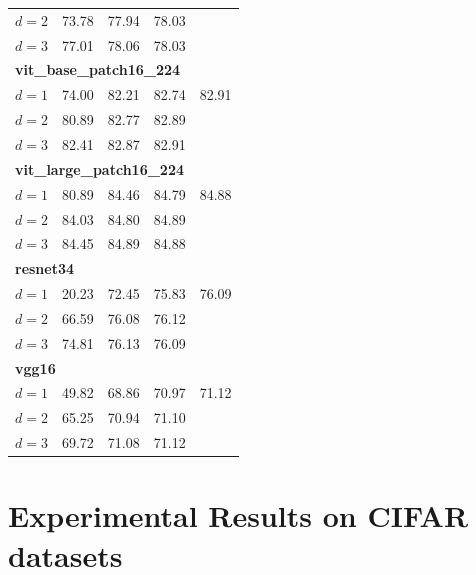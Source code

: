 \begin{table}[htbp]
\begin{minipage}{0.48\textwidth}
\begin{tabular}{lcccc}
$d=2$ & 73.78 & 77.94 & 78.03 \\
$d=3$ & 77.01 & 78.06 & 78.03 \\
\midrule
\multicolumn{5}{l}{\textbf{vit\_base\_patch16\_224}} \\
$d=1$ & 74.00 & 82.21 & 82.74 & 82.91 \\
$d=2$ & 80.89 & 82.77 & 82.89 \\
$d=3$ & 82.41 & 82.87 & 82.91 \\
\midrule
\multicolumn{5}{l}{\textbf{vit\_large\_patch16\_224}} \\
$d=1$ & 80.89 & 84.46 & 84.79 & 84.88 \\
$d=2$ & 84.03 & 84.80 & 84.89 \\
$d=3$ & 84.45 & 84.89 & 84.88 \\
\midrule
\multicolumn{5}{l}{\textbf{resnet34}} \\
$d=1$ & 20.23 & 72.45 & 75.83 & 76.09 \\
$d=2$ & 66.59 & 76.08 & 76.12 \\
$d=3$ & 74.81 & 76.13 & 76.09 \\
\midrule
\multicolumn{5}{l}{\textbf{vgg16}} \\
$d=1$ & 49.82 & 68.86 & 70.97 & 71.12 \\
$d=2$ & 65.25 & 70.94 & 71.10 \\
$d=3$ & 69.72 & 71.08 & 71.12 \\
\bottomrule
\end{tabular}
\end{minipage}
\end{table}

\section{Experimental Results on CIFAR datasets}\label{overall_cifars}


